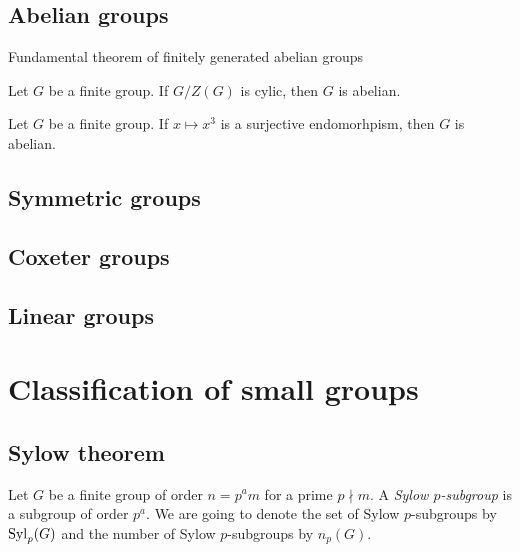 \documentclass{../exp}
\begin{document}
\subsection{Abelian groups}
Fundamental theorem of finitely generated abelian groups

\begin{thm}
Let $G$ be a finite group.
If $G/Z(G)$ is cylic, then $G$ is abelian.
\end{thm}
\begin{thm}
Let $G$ be a finite group.
If $x\mapsto x^3$ is a surjective endomorhpism, then $G$ is abelian.
\end{thm}

\subsection{Symmetric groups}
\subsection{Coxeter groups}
\subsection{Linear groups}





\section{Classification of small groups}

\subsection{Sylow theorem}
\begin{defn}
Let $G$ be a finite group of order $n=p^am$ for a prime $p\nmid m$.
A \emph{Sylow $p$-subgroup} is a subgroup of order $p^a$.
We are going to denote the set of Sylow $p$-subgroups by $\operatorname{Syl}_p(G)$ and the number of Sylow $p$-subgroups by $n_p(G)$.
\end{defn}
\end{document}
